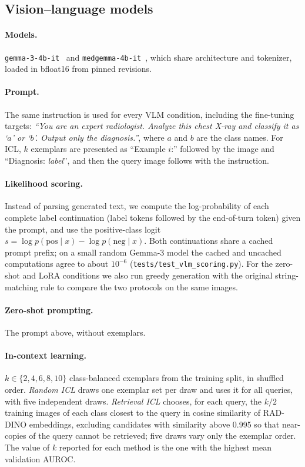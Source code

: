 \documentclass[11pt]{article}
\begin{document}
\subsection{Vision--language models}

\paragraph{Models.} \texttt{gemma-3-4b-it}~\citep{gemma2025gemma3} and
\texttt{medgemma-4b-it}~\citep{sellergren2025medgemma}, which share architecture and tokenizer,
loaded in bfloat16 from pinned revisions.

\paragraph{Prompt.} The same instruction is used for every VLM condition, including the
fine-tuning targets: \emph{``You are an expert radiologist. Analyze this chest X-ray and classify
it as `$a$' or `$b$'. Output only the diagnosis.''}, where $a$ and $b$ are the class names. For
ICL, $k$ exemplars are presented as ``Example $i$:'' followed by the image and ``Diagnosis:
\emph{label}'', and then the query image follows with the instruction.

\paragraph{Likelihood scoring.} Instead of parsing generated text, we compute the
log-probability of each complete label continuation (label tokens followed by the end-of-turn
token) given the prompt, and use the positive-class logit
$s=\log p(\text{pos}\mid x)-\log p(\text{neg}\mid x)$. Both continuations share a cached prompt
prefix; on a small random Gemma-3 model the cached and uncached computations agree to about
$10^{-6}$ (\texttt{tests/test\_vlm\_scoring.py}). For the zero-shot and LoRA conditions we also
run greedy generation with the original string-matching rule to compare the two protocols on
the same images.

\paragraph{Zero-shot prompting.} The prompt above, without exemplars.

\paragraph{In-context learning.} $k\in\{2,4,6,8,10\}$ class-balanced exemplars from the
training split, in shuffled order. \emph{Random ICL} draws one exemplar set per draw and uses it
for all queries, with five independent draws. \emph{Retrieval ICL} chooses, for each query, the
$k/2$ training images of each class closest to the query in cosine similarity of RAD-DINO
embeddings, excluding candidates with similarity above 0.995 so that near-copies of the query
cannot be retrieved; five draws vary only the exemplar order. The value of $k$ reported for
each method is the one with the highest mean validation AUROC.
\end{document}

